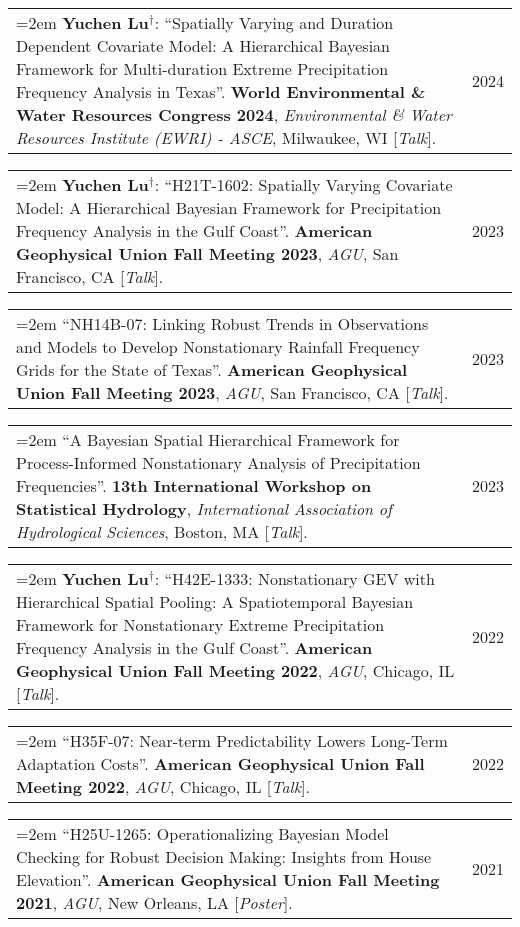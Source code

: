 \documentclass[10pt,oneside]{article}
\makeatletter
\newenvironment{alignedentrieshang}[1][2em]{%
  \noindent%
}{%
}
\newcommand{\hangingitem}[2]{%
  \noindent%
  \begin{tabular*}{\textwidth}{@{}p{0.85\textwidth}@{\extracolsep{\fill}}r@{}}%
    \hangindent=2em \hangafter=1 #1 & #2%
  \end{tabular*}%
}
\makeatother
\begin{document}
\begin{alignedentrieshang}
\hangingitem{\textcolor{RiceBlue}{\textbf{Yuchen Lu}}$^\mathbf{\dagger}$: \enquote{Spatially Varying and Duration Dependent Covariate Model: A Hierarchical Bayesian Framework for Multi-duration Extreme Precipitation Frequency Analysis in Texas}. \textbf{World Environmental \& Water Resources Congress 2024}, \textit{Environmental \& Water Resources Institute (EWRI) - ASCE}, Milwaukee, WI [\textit{Talk}].}{2024}



\hangingitem{\textcolor{RiceBlue}{\textbf{Yuchen Lu}}$^\mathbf{\dagger}$: \enquote{H21T-1602: Spatially Varying Covariate Model: A Hierarchical Bayesian Framework for Precipitation Frequency Analysis in the Gulf Coast}. \textbf{American Geophysical Union Fall Meeting 2023}, \textit{AGU}, San Francisco, CA [\textit{Talk}].}{2023}



\hangingitem{\enquote{NH14B-07: Linking Robust Trends in Observations and Models to Develop Nonstationary Rainfall Frequency Grids for the State of Texas}. \textbf{American Geophysical Union Fall Meeting 2023}, \textit{AGU}, San Francisco, CA [\textit{Talk}].}{2023}



\hangingitem{\enquote{A Bayesian Spatial Hierarchical Framework for Process-Informed Nonstationary Analysis of Precipitation Frequencies}. \textbf{13th International Workshop on Statistical Hydrology}, \textit{International Association of Hydrological Sciences}, Boston, MA [\textit{Talk}].}{2023}



\hangingitem{\textcolor{RiceBlue}{\textbf{Yuchen Lu}}$^\mathbf{\dagger}$: \enquote{H42E-1333: Nonstationary GEV with Hierarchical Spatial Pooling: A Spatiotemporal Bayesian Framework for Nonstationary Extreme Precipitation Frequency Analysis in the Gulf Coast}. \textbf{American Geophysical Union Fall Meeting 2022}, \textit{AGU}, Chicago, IL [\textit{Talk}].}{2022}



\hangingitem{\enquote{H35F-07: Near-term Predictability Lowers Long-Term Adaptation Costs}. \textbf{American Geophysical Union Fall Meeting 2022}, \textit{AGU}, Chicago, IL [\textit{Talk}].}{2022}



\hangingitem{\enquote{H25U-1265: Operationalizing Bayesian Model Checking for Robust Decision Making: Insights from House Elevation}. \textbf{American Geophysical Union Fall Meeting 2021}, \textit{AGU}, New Orleans, LA [\textit{Poster}].}{2021}




\end{alignedentrieshang}
\end{document}

